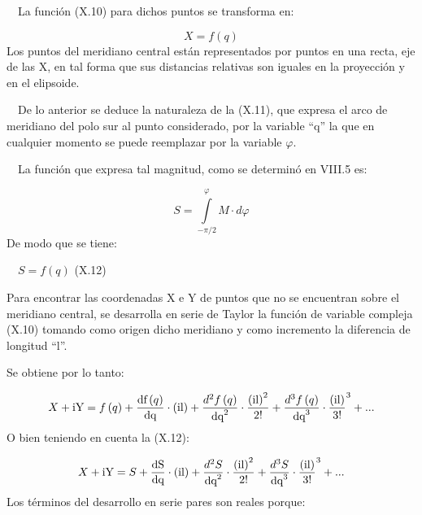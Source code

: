 \documentclass{tufte-book}
\newcommand\normalsubformula[1]{\text{\mathversion{normal}$#1$}}
\begin{document}
\ \ La función (X.10) para dichos puntos se transforma en:

\begin{equation*}
{X=f\left(q\right)}
\end{equation*}
Los puntos del meridiano central están representados por puntos en una
recta, eje de las X, en tal forma que sus distancias relativas son
iguales en la proyección y en el elipsoide.

\ \ De lo anterior se deduce la naturaleza de la (X.11), que expresa el
arco de meridiano del polo sur al punto considerado, por la variable
{\textquotedblleft}q{\textquotedblright} la que en cualquier momento se
puede reemplazar por la variable  ${\varphi }$.

\ \ La función que expresa tal magnitud, como se determinó en VIII.5
es:

\begin{equation*}
{S=\overset{{\varphi }}{\underset{{-\pi /2}}{\int }}{M\cdot
\mathit{d\varphi }}}
\end{equation*}
De modo que se tiene:

\ \  ${S=f\left(q\right)}$  (X.12)

Para encontrar las coordenadas X e Y de puntos que no se encuentran
sobre el meridiano central, se desarrolla en serie de Taylor la
función de variable compleja (X.10) tomando como origen dicho
meridiano y como incremento la diferencia de longitud
{\textquotedblleft}l{\textquotedblright}.

Se obtiene por lo tanto: 

\begin{equation*}
{X+\normalsubformula{\text{iY}}=f\left(q\right)+\frac{\normalsubformula{\text{df}}\left(q\right)}{\normalsubformula{\text{dq}}}\cdot
\left(\normalsubformula{\text{il}}\right)+\frac{d^{{2}}f\left(q\right)}{\normalsubformula{\text{dq}}^{{2}}}\cdot
{\frac{\left(\normalsubformula{\text{il}}\right)^{{2}}}{2!}}+\frac{d^{{3}}f\left(q\right)}{\normalsubformula{\text{dq}}^{{3}}}\cdot
{\frac{\left(\normalsubformula{\text{il}}\right)}{3!}}^{{3}}+\text{.}\text{.}\text{.}}
\end{equation*}
O bien teniendo en cuenta la (X.12):

\begin{equation*}
{X+\normalsubformula{\text{iY}}=S+\frac{\normalsubformula{\text{dS}}}{\normalsubformula{\text{dq}}}\cdot
\left(\normalsubformula{\text{il}}\right)+\frac{d^{{2}}S}{\normalsubformula{\text{dq}}^{{2}}}\cdot
{\frac{\left(\normalsubformula{\text{il}}\right)^{{2}}}{2!}}+\frac{d^{{3}}S}{\normalsubformula{\text{dq}}^{{3}}}\cdot
{\frac{\left(\normalsubformula{\text{il}}\right)}{3!}}^{{3}}+\text{.}\text{.}\text{.}}
\end{equation*}
Los términos del desarrollo en serie pares son reales porque:
\end{document}
